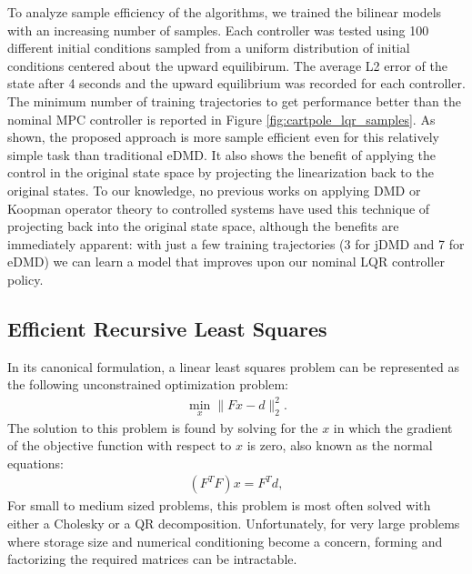 \documentclass{article}
\begin{document}
To analyze sample efficiency of the algorithms, we trained the bilinear models with an 
increasing number of samples. Each controller was tested using 100 different initial
conditions sampled from a uniform distribution of initial conditions centered about the 
upward equilibirum. The average L2 error of the state after 4 seconds and the upward 
equilibrium was recorded for each controller. The minimum number of training trajectories to
get performance better than the nominal MPC controller is reported in Figure 
\ref{fig:cartpole_lqr_samples}. As shown, the proposed approach is more sample efficient 
even for this relatively simple task than traditional eDMD. It also shows the benefit of 
applying the control in the original state space by projecting the linearization back to the
original states. To our knowledge, no previous works on applying DMD or Koopman operator 
theory to controlled systems have used this technique of projecting back into the original 
state space, although the benefits are immediately apparent: with just a few training 
trajectories (3 for jDMD and 7 for eDMD) we can learn a model that improves upon our nominal
LQR controller policy.

\subsection{Efficient Recursive Least Squares}
In its canonical formulation, a linear least squares problem can be represented as the
following unconstrained optimization problem:
\begin{align}
    \min_x \|Fx - d\|_2^2.
\end{align}
The solution to this problem is found by solving for the $x$ in which the gradient of the
objective function with respect to $x$ is zero, also known as the normal equations: 
\begin{align}\label{eq:normal_eq}
    (F^TF)x =F^Td,
\end{align}
For small to medium sized problems, this problem is most often solved with either a Cholesky
or a QR decomposition.  Unfortunately, for very large problems where storage size and
numerical conditioning become a concern, forming and factorizing the required matrices can
be intractable.
\end{document}
